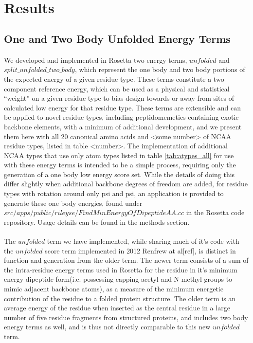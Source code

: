 \section{Results}


\subsection{One and Two Body Unfolded Energy Terms}
\paragraph{}
We developed and implemented in Rosetta two energy terms, $unfolded$ and $split\_unfolded\_two\_body$, which represent the one body and two body portions of the expected energy of a given residue type.
These terms constitute a two component reference energy, which can be used as a physical and statistical ``weight'' on a given residue type to bias design towards or away from sites of calculated low energy for that residue type.
These terms are extensible and can be applied to novel residue types, including peptidomemetics containing exotic backbone elements, with a minimum of additional development, and we present them here with all 20 canonical amino acids and <some number> of NCAA residue types, listed in table <number>.
The implementation of additional NCAA types that use only atom types listed in table \ref{tab:atypes_all} for use with these energy terms is intended to be a simple process, requiring only the generation of a one body low energy score set.
While the details of doing this differ slightly when additional backbone degrees of freedom are added, for residue types with rotation around only psi and psi, an application is provided to generate these one body energies, found under $src/apps/public/rileyse/FindMinEnergyOfDipeptideAA.cc$ in the Rosetta code repository.
Usage details can be found in the methods section.

\paragraph{}
The $unfolded$ term we have implemented, while sharing much of it's code with the $unfolded$ score term implemented in 2012 Renfrew at al[ref], is distinct in function and generation from the older term.
The newer term consists of a sum of the intra-residue energy terms used in Rosetta for the residue in it's minimum energy dipeptide form(i.e. possessing capping acetyl and N-methyl groups to mimic adjacent backbone atoms), as a measure of the minimum energetic contribution of the residue to a folded protein structure.
The older term is an average energy of the residue when inserted as the central residue in a large number of five residue fragments from structured proteins, and includes two body energy terms as well, and is thus not directly comparable to this new $unfolded$ term.

